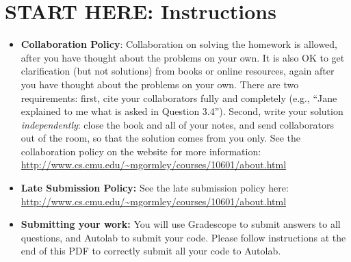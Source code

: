 \documentclass[11pt]{article}
\numberwithin{equation}{section} %
\numberwithin{figure}{section} %
\numberwithin{table}{section} %
\begin{document}
\section*{START HERE: Instructions}
\begin{itemize}

\item \textbf{Collaboration Policy}: Collaboration on solving the homework is allowed, after you have thought about the problems on your own. It is also OK to get clarification (but not solutions) from books or online resources, again after you have thought about the problems on your own. There are two requirements: first, cite your collaborators fully and completely (e.g., ``Jane explained to me what is asked in Question 3.4''). Second, write your solution {\em independently}: close the book and all of your notes, and send collaborators out of the room, so that the solution comes from you only.  See the collaboration policy on the website for more information: \url{http://www.cs.cmu.edu/~mgormley/courses/10601/about.html}
\item\textbf{Late Submission Policy:} See the late submission policy
  here:
  \url{http://www.cs.cmu.edu/~mgormley/courses/10601/about.html}

\item\textbf{Submitting your work:} You will use Gradescope to submit
  answers to all questions, and Autolab to submit your code. Please
  follow instructions at the end of this PDF to correctly submit all your code to Autolab.

  \begin{itemize}
    

    

\end{itemize}
\end{itemize}
\end{document}
